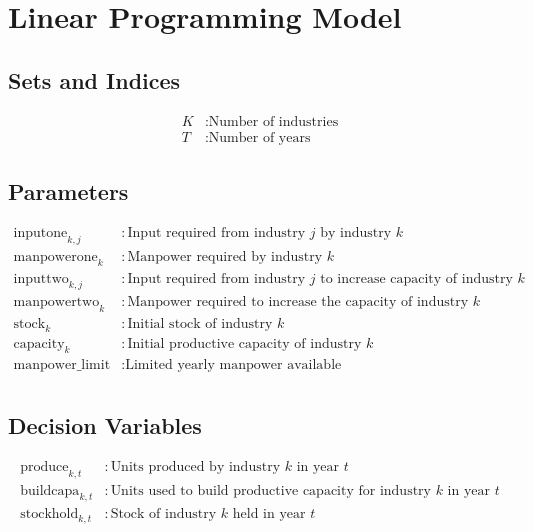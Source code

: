 \documentclass{article}
\begin{document}
\section*{Linear Programming Model}

\subsection*{Sets and Indices}
\begin{align*}
K & : \text{Number of industries} \\
T & : \text{Number of years}
\end{align*}

\subsection*{Parameters}
\begin{align*}
\text{inputone}_{k,j} & : \text{Input required from industry } j \text{ by industry } k \\
\text{manpowerone}_{k} & : \text{Manpower required by industry } k \\
\text{inputtwo}_{k,j} & : \text{Input required from industry } j \text{ to increase capacity of industry } k \\
\text{manpowertwo}_{k} & : \text{Manpower required to increase the capacity of industry } k \\
\text{stock}_{k} & : \text{Initial stock of industry } k \\
\text{capacity}_{k} & : \text{Initial productive capacity of industry } k \\
\text{manpower\_limit} & : \text{Limited yearly manpower available} \\
\end{align*}

\subsection*{Decision Variables}
\begin{align*}
\text{produce}_{k,t} & : \text{Units produced by industry } k \text{ in year } t \\
\text{buildcapa}_{k,t} & : \text{Units used to build productive capacity for industry } k \text{ in year } t \\
\text{stockhold}_{k,t} & : \text{Stock of industry } k \text{ held in year } t \\
\end{align*}
\end{document}
